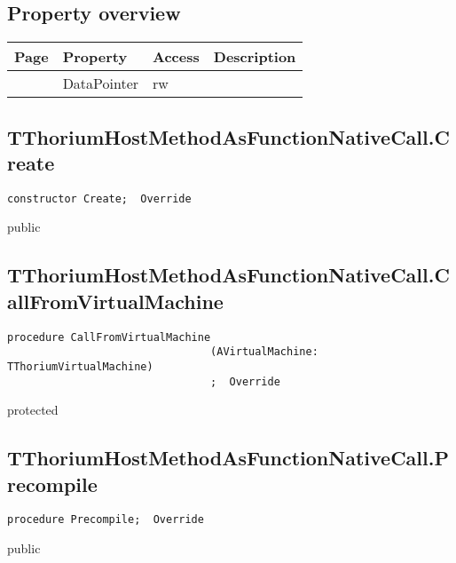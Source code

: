 \subsection{Property overview}
\label{thoriumcorepkg:thorium:tthoriumhostmethodasfunctionnativecall:properties}
\begin{tabularx}{\textwidth}{lllX}
Page & Property & Access & Description \\ \hline
\pageref{thoriumcorepkg:thorium:tthoriumhostmethodasfunctionnativecall:datapointer} & DataPointer & rw &  \\
\hline
\end{tabularx}
\subsection{TThoriumHostMethodAsFunctionNativeCall.Create}
\label{thoriumcorepkg:thorium:tthoriumhostmethodasfunctionnativecall:create}
\begin{FPCList}
\Declaration 

\begin{verbatim}
constructor Create;  Override
\end{verbatim}
\Visibility
public
\end{FPCList}
\subsection{TThoriumHostMethodAsFunctionNativeCall.CallFromVirtualMachine}
\label{thoriumcorepkg:thorium:tthoriumhostmethodasfunctionnativecall:callfromvirtualmachine}
\begin{FPCList}
\Declaration 

\begin{verbatim}
procedure CallFromVirtualMachine
                                (AVirtualMachine: TThoriumVirtualMachine)
                                ;  Override
\end{verbatim}
\Visibility
protected
\end{FPCList}
\subsection{TThoriumHostMethodAsFunctionNativeCall.Precompile}
\label{thoriumcorepkg:thorium:tthoriumhostmethodasfunctionnativecall:precompile}
\begin{FPCList}
\Declaration 

\begin{verbatim}
procedure Precompile;  Override
\end{verbatim}
\Visibility
public
\end{FPCList}

